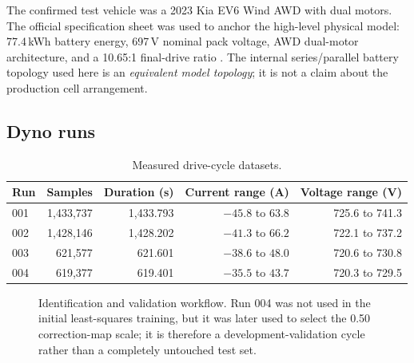 \documentclass[11pt,letterpaper]{article}
\newcommand{\SI}[2]{#1\,#2}
\begin{document}
The confirmed test vehicle was a 2023 Kia EV6 Wind AWD with dual motors. The
official specification sheet was used to anchor the high-level physical model:
\SI{77.4}{kWh} battery energy, \SI{697}{V} nominal pack voltage, AWD dual-motor
architecture, and a 10.65:1 final-drive ratio \cite{kia2023}. The internal
series/parallel battery topology used here is an \emph{equivalent model
topology}; it is not a claim about the production cell arrangement.

\subsection{Dyno runs}

\begin{table}[H]
\centering
\caption{Measured drive-cycle datasets.}
\begin{tabular}{lrrrr}
\toprule
Run & Samples & Duration (s) & Current range (A) & Voltage range (V) \\
\midrule
001 & 1,433,737 & 1,433.793 & $-45.8$ to $63.8$ & 725.6 to 741.3 \\
002 & 1,428,146 & 1,428.202 & $-41.3$ to $66.2$ & 722.1 to 737.2 \\
003 & 621,577   & 621.601   & $-38.6$ to $48.0$ & 720.6 to 730.8 \\
004 & 619,377   & 619.401   & $-35.5$ to $43.7$ & 720.3 to 729.5 \\
\bottomrule
\end{tabular}
\end{table}

\begin{figure}[H]
\centering
{}
\caption{Identification and validation workflow. Run 004 was not used in the initial least-squares training, but it was later used to select the 0.50 correction-map scale; it is therefore a development-validation cycle rather than a completely untouched test set.}
\end{figure}
\end{document}
